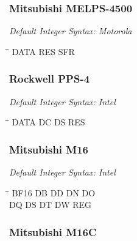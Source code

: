\subsubsection{Mitsubishi MELPS-4500}

{\em Default Integer Syntax: Motorola}

{\tt\begin{tabbing}
\hspace{3cm}\=\hspace{3cm}\=\hspace{3cm}\=\hspace{3cm}\=\kill
DATA       \> RES         \> SFR \\
\end{tabbing}}

\subsubsection{Rockwell PPS-4}

{\em Default Integer Syntax: Intel}

{\tt\begin{tabbing}
\hspace{3cm}\=\hspace{3cm}\=\hspace{3cm}\=\hspace{3cm}\=\kill
DATA       \> DC          \> DS          \> RES \\
\end{tabbing}}


\subsubsection{Mitsubishi M16}

{\em Default Integer Syntax: Intel}

{\tt\begin{tabbing}
\hspace{3cm}\=\hspace{3cm}\=\hspace{3cm}\=\hspace{3cm}\=\kill
BF16       \> DB          \> DD          \> DN          \> DO \\
DQ         \> DS          \> DT          \> DW          \> REG \\
\end{tabbing}}

\subsubsection{Mitsubishi M16C}

